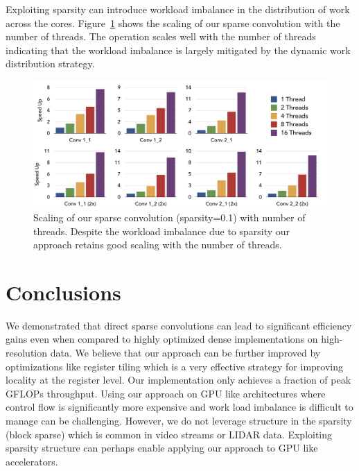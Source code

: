 \documentclass{article}
\begin{document}
Exploiting sparsity can introduce workload imbalance in the distribution of work
across the cores. Figure~\ref{fig:scaling} shows the scaling of our sparse
convolution with the number of threads. The operation scales well with the
number of threads indicating that the workload imbalance is largely mitigated
by the dynamic work distribution strategy.  
\begin{figure}
	\centering
	\includegraphics[width=\textwidth]{scaling}
    \caption{Scaling of our sparse convolution (sparsity=0.1) with number of threads. Despite
    the workload imbalance due to sparsity our approach retains good scaling
    with the number of threads.}
\label{fig:scaling}
\end{figure}

\section{Conclusions}
\label{sec:conclusion}

We demonstrated that direct sparse convolutions can lead to significant
efficiency gains even when compared to highly optimized dense implementations on
high-resolution data. We believe that our approach can be further improved by
optimizations like register tiling which is a very effective strategy for
improving locality at the register level. Our implementation only achieves a
fraction of peak GFLOPs throughput. Using our approach on GPU like architectures
where control flow is significantly more expensive and work load imbalance is
difficult to manage can be challenging.  However, we do not leverage structure
in the sparsity (block sparse) which is common in video streams or LIDAR data.
Exploiting sparsity structure can perhaps enable applying our approach to GPU
like accelerators. 


\nocite{*}
{}
\end{document}
